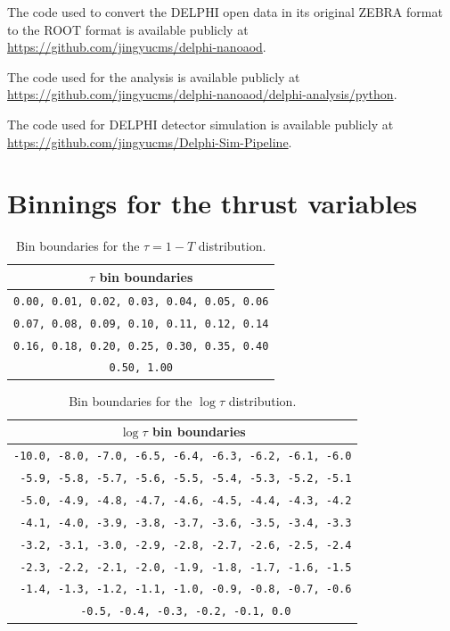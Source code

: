 \documentclass[a4paper,11pt]{article}
\begin{document}
The code used to convert the DELPHI open data in its original ZEBRA format to the ROOT format is available publicly at \url{https://github.com/jingyucms/delphi-nanoaod}. 

The code used for the analysis is available publicly at \url{https://github.com/jingyucms/delphi-nanoaod/delphi-analysis/python}. 

The code used for DELPHI detector simulation is available publicly at \url{https://github.com/jingyucms/Delphi-Sim-Pipeline}. 

\section{Binnings for the thrust variables}
\label{app:thrustbinning}

\begin{table}[ht!]
    \centering
    \caption{Bin boundaries for the \(\tau = 1-T\) distribution.}
    \label{tab:tauBinning}
    \begin{tabular}{c}
        \toprule
        \(\tau\) bin boundaries \\
        \midrule
        \texttt{0.00, 0.01, 0.02, 0.03, 0.04, 0.05, 0.06} \\
        \texttt{0.07, 0.08, 0.09, 0.10, 0.11, 0.12, 0.14} \\
        \texttt{0.16, 0.18, 0.20, 0.25, 0.30, 0.35, 0.40} \\
        \texttt{0.50, 1.00} \\
        \bottomrule
    \end{tabular}
\end{table}

\begin{table}[ht!]
    \centering
    \caption{Bin boundaries for the \(\log\tau\) distribution.}
    \label{tab:logTauBinning} %
    \begin{tabular}{c}
        \toprule
        \(\log\tau\) bin boundaries \\
        \midrule
        \texttt{-10.0,  -8.0,  -7.0,  -6.5,  -6.4,  -6.3,  -6.2,  -6.1,  -6.0} \\
        \texttt{ -5.9,  -5.8,  -5.7,  -5.6,  -5.5,  -5.4,  -5.3,  -5.2,  -5.1} \\
        \texttt{ -5.0,  -4.9,  -4.8,  -4.7,  -4.6,  -4.5,  -4.4,  -4.3,  -4.2} \\
        \texttt{ -4.1,  -4.0,  -3.9,  -3.8,  -3.7,  -3.6,  -3.5,  -3.4,  -3.3} \\
        \texttt{ -3.2,  -3.1,  -3.0,  -2.9,  -2.8,  -2.7,  -2.6,  -2.5,  -2.4} \\
        \texttt{ -2.3,  -2.2,  -2.1,  -2.0,  -1.9,  -1.8,  -1.7,  -1.6,  -1.5} \\
        \texttt{ -1.4,  -1.3,  -1.2,  -1.1,  -1.0,  -0.9,  -0.8,  -0.7,  -0.6} \\
        \texttt{ -0.5,  -0.4,  -0.3,  -0.2,  -0.1,   0.0} \\
        \bottomrule
    \end{tabular}
\end{table}
\end{document}
